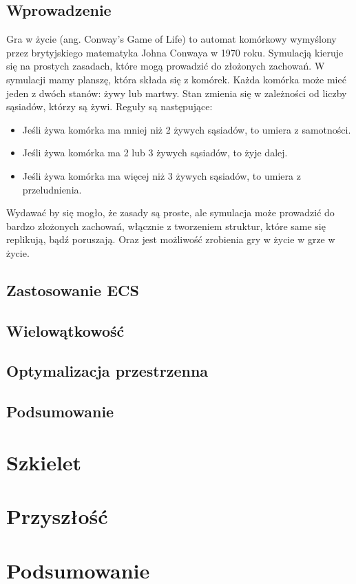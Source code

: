 \documentclass[11pt]{article}
\begin{document}
\subsection{Wprowadzenie}
Gra w życie (ang. Conway's Game of Life) to automat komórkowy wymyślony przez brytyjskiego matematyka Johna Conwaya w 1970 roku.
Symulacją kieruje się na prostych zasadach, które mogą prowadzić do złożonych zachowań.
W symulacji mamy planszę, która składa się z komórek. Każda komórka może mieć jeden z dwóch stanów: żywy lub martwy.
Stan zmienia się w zależności od liczby sąsiadów, którzy są żywi.
Reguły są następujące:
\begin{itemize}
    \item Jeśli żywa komórka ma mniej niż 2 żywych sąsiadów, to umiera z samotności.
    \item Jeśli żywa komórka ma 2 lub 3 żywych sąsiadów, to żyje dalej.
    \item Jeśli żywa komórka ma więcej niż 3 żywych sąsiadów, to umiera z przeludnienia.
\end{itemize}
Wydawać by się mogło, że zasady są proste, ale symulacja może prowadzić do bardzo złożonych zachowań, włącznie z
tworzeniem struktur, które same się replikują, bądź poruszają. Oraz jest możliwość zrobienia gry w życie w grze w życie.
\subsection{Zastosowanie ECS}
\subsection{Wielowątkowość}
\subsection{Optymalizacja przestrzenna}
\subsection{Podsumowanie}

\section{Szkielet}

\section{Przyszłość}

\section{Podsumowanie}
\end{document}
